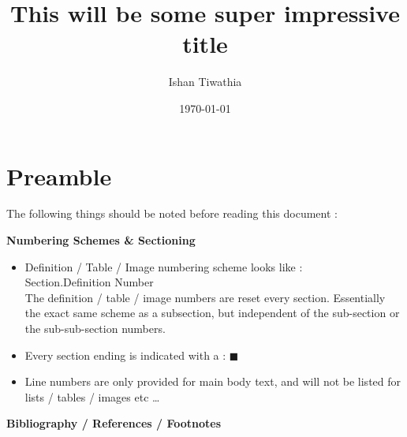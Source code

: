 \documentclass[a4paper,twocolumn,10pt]{article}
\title{This will be some super impressive title}
\author{Ishan Tiwathia}
\date{\today}
\newcommand{\newpar}
{\par \vspace{0.3cm}}
\begin{document}
\raggedbottom
\onecolumn

\tableofcontents
\pagebreak

\listoftables
\clearpage
\twocolumn
\justifying

\section{{Preamble}}
\label{sec:preamble}


The following things should be noted before reading this document :\newpar

\textbf{Numbering Schemes \& Sectioning}

\begin{itemize}[noitemsep]
	\item Definition / Table / Image numbering scheme looks like :\\

		Section.Definition Number\\

		The definition / table / image numbers are reset every section.
		Essentially the exact same scheme as a subsection, but independent of
		the sub-section or the sub-sub-section numbers.\\
	\item Every section ending is indicated with a :  $\blacksquare$ \\
	\item Line numbers are only provided for main body text, and will not be
		listed for lists / tables / images etc \ldots

\end{itemize}

\textbf{Bibliography / References / Footnotes}
\end{document}
